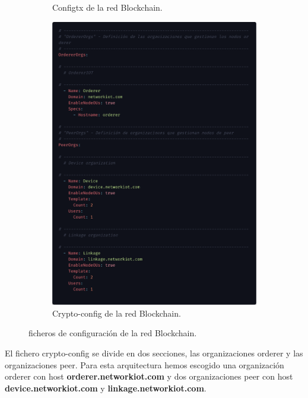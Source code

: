 \begin{figure}[h!]
\begin{subfigure}{0.5\textwidth}
    \caption{Configtx de la red Blockchain.}
    \label{fig:configtx-blockchain}
  \end{subfigure}
  \begin{subfigure}{0.5\textwidth}
    \includegraphics[width=\linewidth]{imagenes/desarrollo/crypto-config}
    \caption{Crypto-config de la red Blockchain.}
    \label{fig:crypto-config-blockchain}
  \end{subfigure}
  \caption{ficheros de configuración de la red Blockchain.}
  \label{fig:config-file-blockchain}
\end{figure}

\newpage

\noindent El fichero crypto-config se divide en dos secciones, las organizaciones orderer y las organizaciones peer. 
Para esta arquitectura hemos escogido una organización orderer con host \textbf{orderer.networkiot.com} y dos 
organizaciones peer con host \textbf{device.networkiot.com} y \textbf{linkage.networkiot.com}. 

